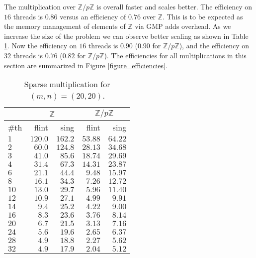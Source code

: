 \documentclass{deliverablereport}
\begin{document}
The multiplication over $\mathbb{Z}/p \mathbb{Z}$ is overall faster and scales better. The efficiency on $16$ threads is $0.86$ versus an efficiency of $0.76$ over $\mathbb{Z}$. This is to be expected as the memory management of elements of $\mathbb{Z}$ via \textsc{GMP} adds overhead. As we increase the size of the problem we can observe better scaling as shown in Table \ref{table_sparse_mul2}. Now the efficiency on $16$ threads is $0.90$ ($0.90$ for $\mathbb{Z}/p \mathbb{Z}$), and the efficiency on $32$ threads is $0.76$ ($0.82$ for $\mathbb{Z}/p \mathbb{Z}$).
The efficiencies for all multiplications in this section are summarized in Figure \ref{figure_efficiencies}.
\begin{table}[htb]
\begin{tabular}{l | r | r | r | r | }
& \multicolumn{2}{|c|}{$\mathbb{Z}$} & \multicolumn{2}{|c|}{$\mathbb{Z}/p \mathbb{Z}$} \\ \hline
\#th   & flint & sing & flint & sing\\ \hline
$1$   & $120.0$ & $162.2$ &$53.88$ & $64.22$\\ \hline
$2$   & $60.0$ & $124.8$ &$28.13$ & $34.68$\\ \hline
$3$   & $41.0$ & $85.6$ &$18.74$ & $29.69$\\ \hline
$4$   & $31.4$ & $67.3$ &$14.31$ & $23.87$\\ \hline
$6$   & $21.1$ & $44.4$ &$9.48$ & $15.97$\\ \hline
$8$   & $16.1$ & $34.3$ &$7.26$ & $12.72$\\ \hline
$10$  & $13.0$ & $29.7$ &$5.96$ & $11.40$\\ \hline
$12$  & $10.9$ & $27.1$ &$4.99$ & $9.91$\\ \hline
$14$  & $9.4$ &  $25.2$  &$4.22$ & $9.00$\\ \hline
$16$  & $8.3$ &  $23.6$  &$3.76$ & $8.14$\\ \hline
$20$  & $6.7$ &  $21.5$  &$3.13$ & $7.16$\\ \hline
$24$  & $5.6$ &  $19.6$  &$2.65$ & $6.37$\\ \hline
$28$  & $4.9$ &  $18.8$  &$2.27$ & $5.62$\\ \hline
$32$  & $4.9$ &  $17.9$  &$2.04$ & $5.12$\\ \hline
\end{tabular}
\caption{Sparse multiplication for $(m, n) = (20, 20)$.}
\label{table_sparse_mul2}
\end{table}
\end{document}
